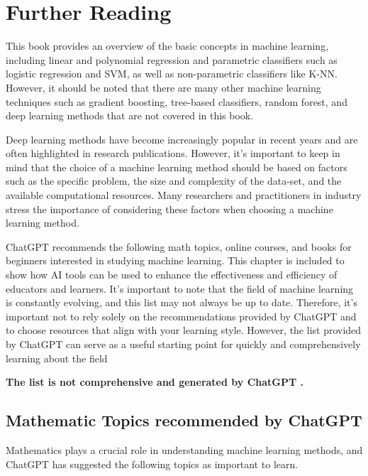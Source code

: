 \chapter{Further Reading}

This book provides an overview of the basic concepts in machine learning, including linear and polynomial regression and parametric classifiers such as logistic regression and SVM, as well as non-parametric classifiers like K-NN. However, it should be noted that there are many other machine learning techniques such as gradient boosting, tree-based classifiers, random forest, and deep learning methods that are not covered in this book.

Deep learning methods have become increasingly popular in recent years and are often highlighted in research publications. However, it's important to keep in mind that the choice of a machine learning method should be based on factors such as the specific problem, the size and complexity of the data-set, and the available computational resources. Many researchers and practitioners in industry stress the importance of considering these factors when choosing a machine learning method.

ChatGPT \cite{web:chatgpt} recommends the following math topics, online courses, and books for beginners interested in studying machine learning. This chapter is included to show how AI tools can be used to enhance the effectiveness and efficiency of educators and learners. It's important to note that the field of machine learning is constantly evolving, and this list may not always be up to date. Therefore, it's important not to rely solely on the recommendations provided by ChatGPT and to choose resources that align with your learning style. However, the list provided by ChatGPT can serve as a useful starting point for quickly and comprehensively learning about the field

\textbf{The list is not comprehensive and generated by ChatGPT \cite{web:chatgpt}. }


\newpage
\section{Mathematic Topics recommended by ChatGPT}
Mathematics plays a crucial role in understanding machine learning methods, and ChatGPT has suggested the following topics as important to learn.

